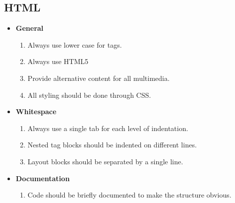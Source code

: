\documentclass[11pt,a4paper]{article}
\begin{document}
\subsection{HTML}
\begin{itemize}
\item \textbf{General}
	\begin{enumerate}
	\item Always use lower case for tags.
    \item Always use HTML5
    \item Provide alternative content for all multimedia.
    \item All styling should be done through CSS.
	\end{enumerate}
\item \textbf{Whitespace}
	\begin{enumerate}
    \item Always use a single tab for each level of indentation.
    \item Nested tag blocks should be indented on different lines.
    \item Layout blocks should be separated by a single line.
	\end{enumerate}
\item \textbf{Documentation}
	\begin{enumerate}
	\item Code should be briefly documented to make the structure obvious.
	\end{enumerate}
\end{itemize}
\end{document}
